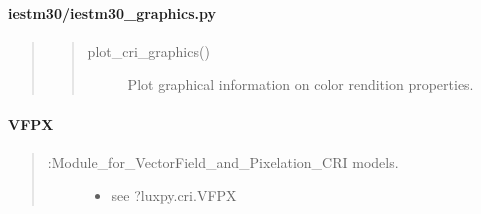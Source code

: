 \documentclass[letterpaper,10pt,english]{sphinxmanual}
\begin{document}
\paragraph{iestm30/iestm30\_graphics.py}
\label{\detokenize{color:iestm30-iestm30-graphics-py}}\begin{quote}
\begin{quote}\begin{description}
\item[{plot\_cri\_graphics()}] \leavevmode
Plot graphical information on color rendition properties.

\end{description}\end{quote}
\end{quote}


\paragraph{VFPX}
\label{\detokenize{color:vfpx}}\begin{quote}
\begin{description}
\item[{:Module\_for\_VectorField\_and\_Pixelation\_CRI models.}] \leavevmode\begin{itemize}
\item {} 
see ?luxpy.cri.VFPX

\end{itemize}

\end{description}
\end{quote}
\end{document}
